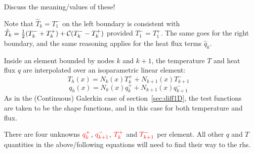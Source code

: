 {\color{green} Discuss the meaning/values of these!}

\begin{remark}
Note that $\hat{T}_k=T_1^-$ on the left boundary is consistent with 
$\hat{T}_k=\frac{1}{2}(T_k^-+T_k^+) + {\cal C} (T_k^- - T_k^+)$ provided $T_1^-=T_1^+$.
The same goes for the right boundary, and the same reasoning applies for the heat flux terms $\hat{q}_k$. 
\end{remark}

Inside an element bounded by nodes $k$ and $k+1$, 
the temperature $T$ and heat flux $q$ are interpolated over an isoparametric linear element:
\[
T_h(x) = N_k(x) T_k^+ + N_{k+1}(x)T_{k+1}^-
\]
\[
q_h(x) = N_k(x) q_k^+ + N_{k+1}(x)q_{k+1}^-
\]
As in the (Continuous) Galerkin case of section~\ref{sec:diff1D}, the test functions are taken to 
be the shape functions, and in this case for both temperature and flux. 

There are four unknowns ${\color{red} q_k^+}$, ${\color{red} q_{k+1}^-}$, 
${\color{red}T_k^+}$ and ${\color{red}T_{k+1}^-}$ per element. 
All other $q$ and $T$ quantities in the above/following equations will need to find their way to the rhs. 


